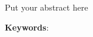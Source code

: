 {
    \cleardoublepage%
    \let\clearpage\relax%
    \begin{center}
        \noindent\textbf{\huge\getTitle}
    \end{center}
    \vspace{0.25cm}
    \begin{center}
        \noindent\textbf{\Large\getAuthor}
    \end{center}
    \vspace{-1cm}
    \chapter*{\centering \abstractname}
} \noindent

Put your abstract here

\noindent\textbf{Keywords}: \getKeywords{}
